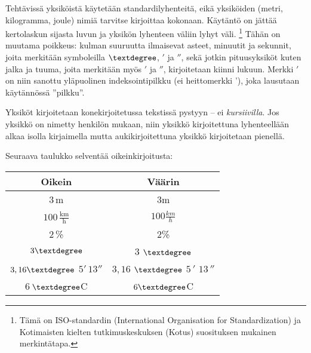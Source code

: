 
Tehtävissä yksiköistä käytetään standardilyhenteitä, eikä yksiköiden (metri, kilogramma, joule) nimiä tarvitse kirjoittaa kokonaan. Käytäntö on jättää kertolaskun sijasta luvun ja yksikön lyhenteen väliin lyhyt väli. \footnote{Tämä on ISO-standardin (International Organisation for Standardization) ja Kotimaisten kielten tutkimuskeskuksen (Kotus) suosituksen mukainen merkintätapa.} Tähän on muutama poikkeus: kulman suuruutta ilmaisevat asteet, minuutit ja sekunnit, joita merkitään symboleilla $\textdegree$, $'$ ja $''$, sekä jotkin pituusyksiköt kuten jalka ja tuuma, joita merkitään myös $'$ ja $''$, kirjoitetaan kiinni lukuun. Merkki $'$ on niin sanottu yläpuolinen indeksointipilkku (ei heittomerkki '), joka lausutaan käytännössä ''pilkku''.

Yksiköt kirjoitetaan konekirjoitetussa tekstissä pystyyn -- ei \textit{kursiivilla}. Jos yksikkö on nimetty henkilön mukaan, niin yksikkö kirjoitettuna lyhenteellään alkaa isolla kirjaimella mutta aukikirjoitettuna yksikkö kirjoitetaan pienellä.

\begin{esimerkki}
\end{esimerkki}

\begin{esimerkki}
Seuraava taulukko selventää oikeinkirjoitusta:
\begin{center}
\begin{tabular}{c|c}
Oikein & Väärin \\
\hline
$3$\,m & $3$m 	\\
$100$\,$\frac{\text{km}}{\text{h}}$ & $100\frac{km}{h}$	\\
$2$\,\% & $2$\% \\
$3\textdegree$ & $3$ $\textdegree$\\
$3,16\textdegree$ $5'$\,$13''$ & $3,16$ $\textdegree$ $5$\,$'$ $13$\,$''$ 	\\
$6$\,$\textdegree$C & $6\textdegree$C 	\\
\end{tabular}
\end{center}
\end{esimerkki}

